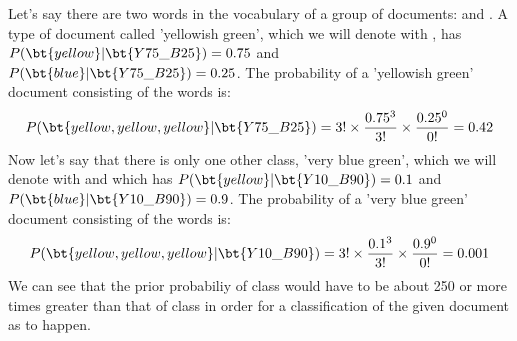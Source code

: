 \newpage



Let's say there are two words in the vocabulary of a group of documents:  and . A type of document called 'yellowish green', which we will denote with , has $P(\bt{yellow}|\bt{Y75\_B25})=0.75$ and $P(\bt{blue}|\bt{Y75\_B25})=0.25$. The probability of a 'yellowish green' document consisting of the words  is:
$$ P(\bt{yellow, yellow, yellow}|\bt{Y75\_B25})=3! \times \dfrac{0.75^3}{3!} \times \dfrac{0.25^0}{0!}= 0.42$$
Now let's say that there is only one other class, 'very blue green', which we will denote with  and which has $P(\bt{yellow}|\bt{Y10\_B90})=0.1$ and $P(\bt{blue}|\bt{Y10\_B90})=0.9$. The probability of a 'very blue green' document consisting of the words  is:
$$ P(\bt{yellow, yellow, yellow}|\bt{Y10\_B90})=3! \times \dfrac{0.1^3}{3!} \times \dfrac{0.9^0}{0!}= 0.001$$
We can see that the prior probabiliy of class  would have to be about 250 or more times greater than that of class  in order for a classification of the given document as  to happen.


\newpage
{}

